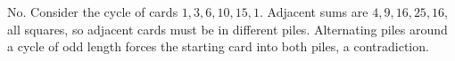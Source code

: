 No. Consider the cycle of cards $1,3,6,10,15,1$. Adjacent sums are $4,9,16,25,16$, all squares, so adjacent cards must be in different piles. Alternating piles around a cycle of odd length forces the starting card into both piles, a contradiction.
